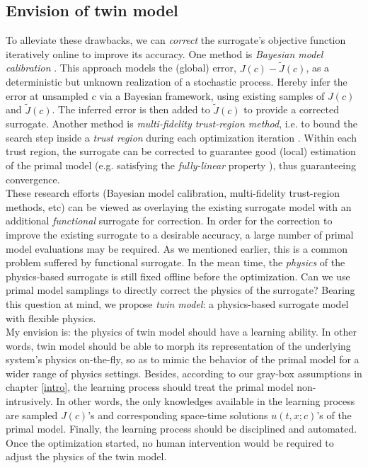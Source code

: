 \documentclass[a4paper,onecolumn]{article}
\theoremstyle{remark}
\begin{document}
\subsection{Envision of twin model}
\noindent To alleviate these drawbacks, we can \emph{correct} the surrogate's objective function
iteratively online to improve its accuracy. 
One method is \emph{Bayesian model calibration}
\cite{KennedyOhagan1, andrewras}. This approach models the (global) error,
$J(c) - \tilde{J}(c)$, as a deterministic but unknown  
realization of a stochastic process. 
Hereby infer the error at unsampled $c$ via a Bayesian framework,
using existing samples of $J(c)$ and $\tilde{J}(c)$.
The inferred error is then added to $\tilde{J}(c)$ to provide a corrected surrogate.
Another method is \emph{multi-fidelity trust-region method}, i.e. to bound the search step
inside a \emph{trust region} during each optimization iteration \cite{trustregionwild}.
Within each trust region, the surrogate can be corrected to guarantee good (local) estimation
of the primal model (e.g. satisfying the \emph{fully-linear} property \cite{trustregionconn}),
thus guaranteeing convergence.\\

\noindent These research efforts (Bayesian model calibration, multi-fidelity 
trust-region methods, etc) can be viewed as overlaying the existing surrogate model with 
an additional \emph{functional}
surrogate for correction. In order for the correction to improve the existing surrogate 
to a desirable accuracy, a large number of primal model evaluations may be required.
As we mentioned earlier, this is a common problem suffered by functional surrogate.
In the mean time, the \emph{physics} of the physics-based surrogate is still fixed offline
before the optimization. Can we use primal model samplings to
directly correct the physics of the surrogate? Bearing this question at mind,
we propose \emph{twin model}: a physics-based surrogate model with flexible physics.\\

\noindent My envision is: the physics of twin model should have a learning
ability. In other words, twin model should be able to morph its representation of the 
underlying system's physics on-the-fly, so as to mimic the behavior of the primal model for
a wider range of physics settings.
Besides, according to our gray-box assumptions in chapter \ref{intro},
the learning process should treat the primal model non-intrusively.
In other words, the only knowledges available in the learning process
are sampled $J(c)$'s and corresponding space-time solutions $u(t,x;c)$'s of the primal model.
Finally, the learning process should be disciplined and automated. 
Once the optimization started, no human intervention would be required
to adjust the physics of the twin model.\\
\end{document}
